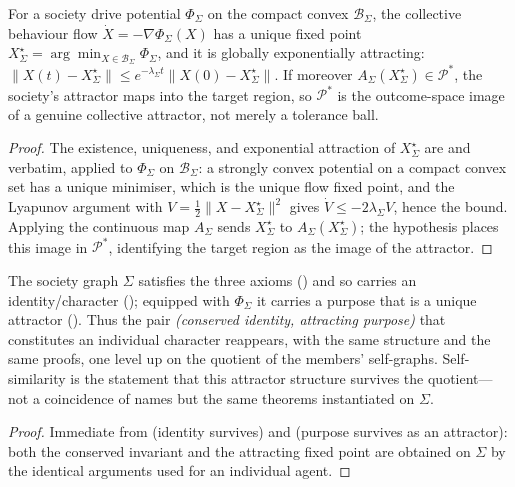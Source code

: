\documentclass[11pt,twocolumn,a4paper]{article}
\newcommand{\Beh}{\mathcal{B}}       %
\newcommand{\Purp}{\mathcal{P}}      %
\newcommand{\Soc}{\Sigma}            %
\newcommand{\norm}[1]{\lVert#1\rVert}
\begin{document}
\begin{theorem}
\label{thm:socattractor}
For a society drive potential $\Phi_\Soc$ on the compact convex
$\Beh_\Soc$, the collective behaviour flow $\dot X=-\nabla\Phi_\Soc(X)$ has
a unique fixed point $X^\star_\Soc=\arg\min_{X\in\Beh_\Soc}\Phi_\Soc$, and
it is globally exponentially attracting:
$\norm{X(t)-X^\star_\Soc}\le e^{-\lambda_\Soc t}\norm{X(0)-X^\star_\Soc}$.
If moreover $A_\Soc(X^\star_\Soc)\in\Purp^\ast$, the society's attractor
maps into the target region, so $\Purp^\ast$ is the outcome-space image of
a genuine collective attractor, not merely a tolerance ball.
\end{theorem}

\begin{proof}
The existence, uniqueness, and exponential attraction of $X^\star_\Soc$ are
 and  verbatim, applied to
$\Phi_\Soc$ on $\Beh_\Soc$: a strongly convex potential on a compact convex
set has a unique minimiser, which is the unique flow fixed point, and the
Lyapunov argument with $V=\tfrac12\norm{X-X^\star_\Soc}^2$ gives
$\dot V\le-2\lambda_\Soc V$, hence the bound. Applying the continuous map
$A_\Soc$ sends $X^\star_\Soc$ to $A_\Soc(X^\star_\Soc)$; the hypothesis
places this image in $\Purp^\ast$, identifying the target region as the
image of the attractor.
\end{proof}

\begin{corollary}
\label{cor:selfsimilar}
The society graph $\Soc$ satisfies the three axioms ()
and so carries an identity/character (); equipped
with $\Phi_\Soc$ it carries a purpose that is a unique attractor
(). Thus the pair \emph{(conserved identity, attracting
purpose)} that constitutes an individual character reappears, with the same
structure and the same proofs, one level up on the quotient of the members'
self-graphs. Self-similarity is the statement that this attractor structure
survives the quotient---not a coincidence of names but the same theorems
instantiated on $\Soc$.
\end{corollary}

\begin{proof}
Immediate from  (identity survives) and
 (purpose survives as an attractor): both the
conserved invariant and the attracting fixed point are obtained on $\Soc$
by the identical arguments used for an individual agent.
\end{proof}
\end{document}
